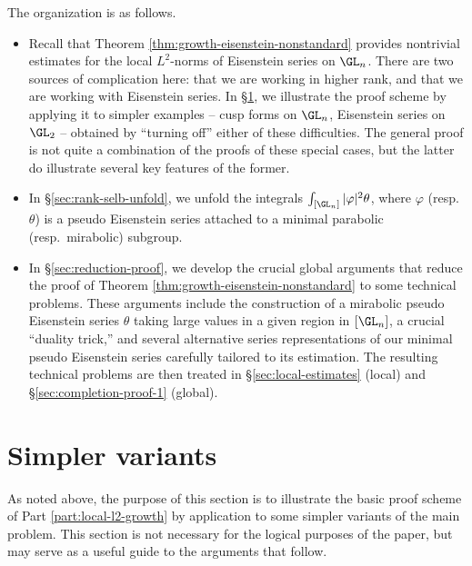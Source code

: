 The organization is as follows.
\begin{itemize}
\item Recall that Theorem \ref{thm:growth-eisenstein-nonstandard} provides nontrivial estimates for the local $L^2$-norms of Eisenstein series on $\GL_n$.  There are two sources of complication here: that we are working in higher rank, and that we are working with Eisenstein series.  In \S\ref{sec:simpler-variants}, we illustrate the proof scheme by applying it to simpler examples -- cusp forms on $\GL_n$, Eisenstein series on $\GL_2$ -- obtained by  ``turning off'' either of these difficulties.  The general proof is not quite a combination of the proofs of these special cases, but the latter do illustrate several key features of the former.
\item
  In \S\ref{sec:rank-selb-unfold}, we unfold the integrals $\int_{[\GL_n]} |\varphi|^2 \theta$, where $\varphi$ (resp.\ $\theta$) is a pseudo Eisenstein series attached to a minimal parabolic (resp.\ mirabolic) subgroup.
\item
  In \S\ref{sec:reduction-proof}, we develop the crucial global arguments that reduce the proof of Theorem \ref{thm:growth-eisenstein-nonstandard} to some technical problems.  These arguments include the construction of a mirabolic pseudo Eisenstein series $\theta$ taking large values in a given region in $[\GL_n]$, a crucial ``duality trick,'' and several alternative series representations of our minimal pseudo Eisenstein series carefully tailored to its estimation.  The resulting technical problems are then treated in \S\ref{sec:local-estimates} (local) and \S\ref{sec:completion-proof-1} (global).
\end{itemize}

\section{Simpler variants}\label{sec:simpler-variants}
As noted above, the purpose of this section is to illustrate the basic proof scheme of Part \ref{part:local-l2-growth} by application to some simpler variants of the main problem.  This section is not necessary for the logical purposes of the paper, but may serve as a useful guide to the arguments that follow.

